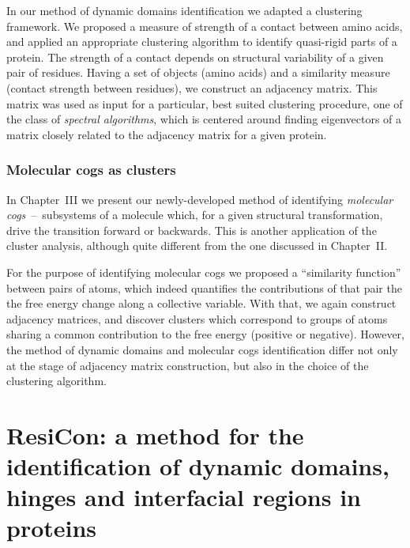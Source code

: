 \documentclass[a4paper,11pt,twoside]{book}%
\begin{document}
In our method of dynamic domains identification we adapted a clustering framework.
We proposed a measure of strength of a contact between amino acids, and applied an appropriate clustering algorithm to identify quasi-rigid parts of a protein.
The strength of a contact depends on structural variability of a given pair of residues.
Having a set of objects (amino acids) and a similarity measure (contact strength between residues), we construct an adjacency matrix.
This matrix was used as input for a particular, best suited clustering procedure, one of the class of \emph{spectral algorithms}, which is centered around finding eigenvectors of a matrix closely related to the adjacency matrix for a given protein.

\subsection{Molecular cogs as clusters}

In Chapter~III we present our newly-developed method of identifying \emph{molecular cogs}~--~subsystems of a molecule which, for a given structural transformation, drive the transition forward or backwards.
This is another application of the cluster analysis, although quite different from the one discussed in Chapter~II.

For the purpose of identifying molecular cogs we proposed a ``similarity function'' between pairs of atoms, which indeed quantifies the contributions of that pair the the free energy change along a collective variable.
With that, we again construct adjacency matrices, and discover clusters which correspond to groups of atoms sharing a common contribution to the free energy (positive or negative).
However, the method of dynamic domains and molecular cogs identification differ not only at the stage of adjacency matrix construction, but also in the choice of the clustering algorithm.





\newcommand{\angstrom}{\mbox{\normalfont\AA}}
\newcommand{\myHeight}{0.13}
\renewcommand{\arraystretch}{1.9} %

\chapter{ResiCon: a method for the identification of dynamic domains, hinges and interfacial regions in proteins}
\end{document}
